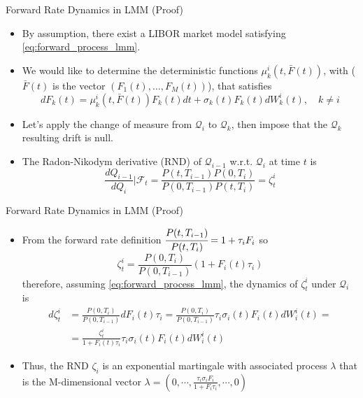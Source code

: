 \documentclass{beamer}
\begin{document}
\begin{frame}{Forward Rate Dynamics in LMM (Proof)}
  \begin{itemize}
  \item<1-> By assumption, there exist a LIBOR market model satisfying \cref{eq:forward_process_lmm}.
  \item<2-> We would like to determine the deterministic functions $\mu_k^i(t, \bar{F}(t))$, with ($\bar{F}(t)$ is the vector $(F_1(t),\ldots, F_M(t))$), that satisfies
    \begin{equation}
      dF_k(t) = \mu_k^i(t, \bar{F}(t))F_k(t)dt + \sigma_k(t)F_k(t)dW^i_k(t),\quad k\neq i
      \label{eq:forward_dynamics_in_lfm}
    \end{equation}
  \item<3-> Let's apply the change of measure from $\mathcal{Q}_i$ to $\mathcal{Q}_k$, then impose that the $\mathcal{Q}_k$ resulting drift is null. 
  \item<4-> The Radon-Nikodym derivative (RND) of $\mathcal{Q}_{i-1}$ w.r.t. $\mathcal{Q}_i$ at time $t$ is
    \begin{equation*}
      \frac{dQ_{i-1}}{dQ_i}\bigg|\mathcal{F}_t = \frac{P(t, T_{i-1})P(0, T_i)}{P(0, T_{i-1})P(t, T_i)} = \zeta^i_t
    \end{equation*}
  \end{itemize}
\end{frame}

\begin{frame}{Forward Rate Dynamics in LMM (Proof)}
  \begin{itemize}
  \item<1-> From the forward rate definition $\cfrac{P(t,T_{i-1})}{P(t,T_i)} = 1 + \tau_i F_i$ so
    \begin{equation*}
      \zeta^i_t = \frac{P(0, T_i)}{P(0, T_{i-1})}(1+F_i(t)\tau_i)
    \end{equation*}
    therefore, assuming \cref{eq:forward_process_lmm}, the dynamics of $\zeta^i_t$ under $\mathcal{Q}_i$ is
    \begin{equation*}
      \begin{aligned}
	d\zeta^i_t &= \frac{P(0, T_i)}{P(0, T_{i-1})}dF_i(t)\tau_i = \frac{P(0, T_i)}{P(0, T_{i-1})}\tau_i\sigma_i(t)F_i(t)dW^i_i(t) = \\ &= \frac{\zeta_t^i}{1+F_i(t)\tau_i}\tau_i\sigma_i(t)F_i(t)dW^i_i(t)
      \end{aligned}
    \end{equation*}
  \item<2-> Thus, the RND $\zeta_i$ is an exponential martingale with associated process $\lambda$ that is the M-dimensional vector $\lambda = \left(0,\cdots,\frac{\tau_i\sigma_iF_i}{1+F_i\tau_i},\cdots, 0\right)$
  \end{itemize}
\end{frame}
\end{document}
